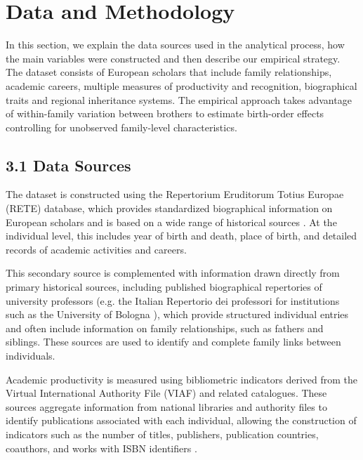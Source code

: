 \setcounter{section}{5}
\section*{Data and Methodology}

In this section, we explain the data sources used in the analytical process, how the main variables were constructed and then describe our empirical strategy. The dataset consists of European scholars that include family relationships, academic careers, multiple measures of productivity and recognition, biographical traits and regional inheritance systems. The empirical approach takes advantage of within-family variation between brothers to estimate birth-order effects controlling for unobserved family-level characteristics.

\subsection*{3.1 Data Sources}

The dataset is constructed using the Repertorium Eruditorum Totius Europae (RETE) database, which provides standardized biographical information on European scholars and is based on a wide range of historical sources \citep{curtis2026academic}. At the individual level, this includes year of birth and death, place of birth, and detailed records of academic activities and careers.

This secondary source is complemented with information drawn directly from primary historical sources, including published biographical repertories of university professors (e.g. the Italian Repertorio dei professori for institutions such as the University of Bologna ), which provide structured individual entries and often include information on family relationships, such as fathers and siblings. These sources are used to identify and complete family links between individuals.

Academic productivity is measured using bibliometric indicators derived from the Virtual International Authority File (VIAF) and related catalogues. These sources aggregate information from national libraries and authority files to identify publications associated with each individual, allowing the construction of indicators such as the number of titles, publishers, publication countries, coauthors, and works with ISBN identifiers \citep{curtis2026academic}.

